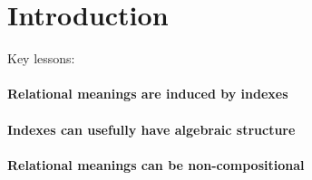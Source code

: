 \section{Introduction}
\label{sec:introduction}



Key lessons:

\paragraph{Relational meanings are induced by indexes}

\paragraph{Indexes can usefully have algebraic structure}

\paragraph{Relational meanings can be non-compositional}

